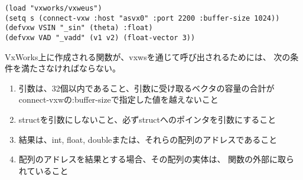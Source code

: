 \begin {verbatim}
(load "vxworks/vxweus")
(setq s (connect-vxw :host "asvx0" :port 2200 :buffer-size 1024))
(defvxw VSIN "_sin" (theta) :float)
(defvxw VAD "_vadd" (v1 v2) (float-vector 3))
\end{verbatim}

VxWorks上に作成される関数が、vxwsを通じて呼び出されるためには、
次の条件を満たさなければならない。

\begin{enumerate}
\setlength{\itemsep}{0cm}
\item 引数は、32個以内であること、引数に受け取るベクタの容量の合計が
connect-vxwの:buffer-sizeで指定した値を越えないこと
\item structを引数にしないこと、必ずstructへのポインタを引数にすること
\item 結果は、int, float, doubleまたは、それらの配列のアドレスであること
\item 配列のアドレスを結果とする場合、その配列の実体は、
関数の外部に取られていること
\end{enumerate}

